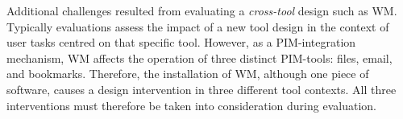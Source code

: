 
Additional challenges resulted from evaluating a \textit{cross-tool} design such as WM.  
Typically evaluations assess the impact of a new tool design in the context of user tasks centred on that specific tool.  However, as a PIM-integration mechanism, WM affects the operation of three distinct PIM-tools: files, email, and bookmarks.  Therefore, the installation of WM, although one piece of software, causes a design intervention in three different tool contexts.  All three interventions must therefore be taken into consideration during evaluation.  %



	
